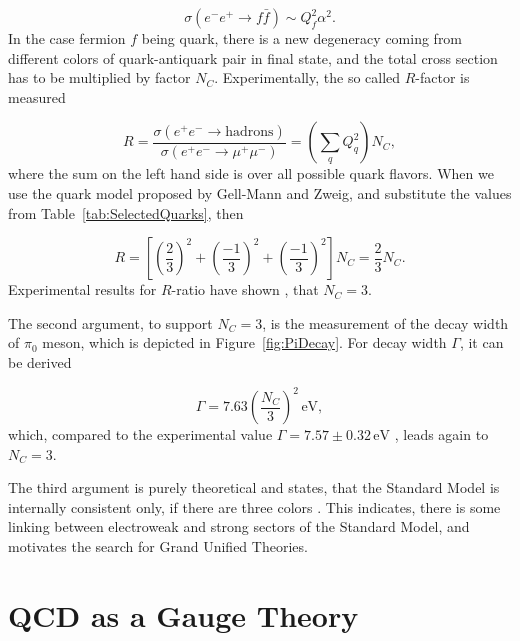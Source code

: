 \begin{equation}
  \sigma (e^- e^+ \rightarrow f \bar{f} ) \sim Q_f^2 \alpha^2.
  \label{eq:NumberOfColorsBasicCrossSection}
\end{equation}
In the case fermion $f$ being quark, there is a new degeneracy coming from
different colors of quark-antiquark pair in final state, and the total cross
section has to be multiplied by factor $N_C$. Experimentally, the so called
$R$-factor is measured

\begin{equation}
  R = \frac{\sigma(e^+ e^- \rightarrow \text{hadrons})}{\sigma(e^+ e^-
  \rightarrow \mu^+ \mu^-)} = \left( \sum_q Q_q^2 \right) N_C,
  \label{eq:NumberOfColorsRatio}
\end{equation}
where the sum on the left hand side is over all possible quark flavors. When we
use the quark model proposed by Gell-Mann and Zweig, and substitute the values
from Table~\ref{tab:SelectedQuarks}, then

\begin{equation}
  R = \left[ \left( \frac{2}{3} \right)^2 +
    \left( \frac{-1}{3} \right)^2 +
  \left( \frac{-1}{3} \right)^2 \right] N_C = \frac{2}{3}N_C.
  \label{eq:NumberOfColorsSubstitued}
\end{equation}
Experimental results for $R$-ratio have shown \cite{PDG}, that $N_C = 3$.

The second argument, to support $N_C=3$, is the measurement of the decay width of
$\pi_0$ meson, which is depicted in Figure~\ref{fig:PiDecay}. For decay width
$\Gamma$, it can be derived 

\begin{equation}
  \Gamma = 7.63 \left( \frac{N_C}{3} \right)^2 \, \text{eV},
  \label{ex:PiMesonDecayWidth}
\end{equation}
which, compared to the experimental value $\Gamma = 7.57 \pm 0.32 \, \text{eV}$
\cite{PDG}, leads again to $N_C=3$.

The third argument is purely theoretical and states, that the Standard Model is
internally consistent only, if there are three colors \cite{QCDTextbook}. This
indicates, there is some linking between electroweak and strong sectors of
the Standard Model, and motivates the search for Grand Unified Theories.

\section{QCD as a Gauge Theory}

